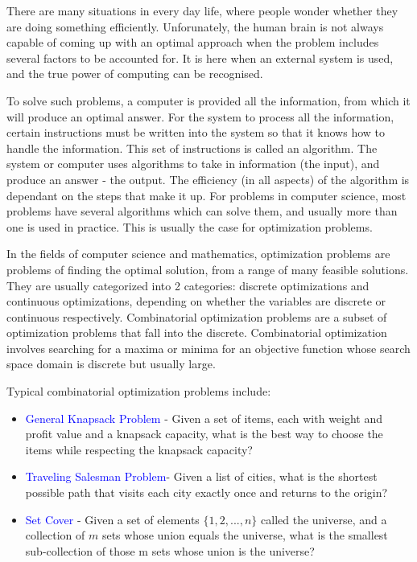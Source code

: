 \documentclass[titlepage]{article}
\begin{document}
\renewcommand{\familydefault}{Computer Modern}
There are many situations in every day life, where people wonder whether they are doing something efficiently. Unforunately, the human brain is not always capable of coming up with an optimal approach when the problem includes several factors to be accounted for. It is here when an external system is used, and the true power of computing can be recognised. 

To solve such problems, a computer is provided all the information, from which it will produce an optimal answer. For the system to process all the information, certain instructions must be written into the system so that it knows how to handle the information. This set of instructions is called an algorithm. The system or computer uses algorithms to take in information (the input), and produce an answer - the output. The efficiency (in all aspects) of the algorithm is dependant on the steps that make it up. For problems in computer science, most problems have several algorithms which can solve them, and usually more than one is used in practice. This is usually the case for optimization problems. 

In the fields of computer science and mathematics, optimization problems are problems of finding the optimal solution, from a range of many feasible solutions. They are usually categorized into 2 categories: discrete optimizations and continuous optimizations, depending on whether the variables are discrete or continuous respectively. Combinatorial optimization problems are a subset of optimization problems that fall into the discrete. Combinatorial optimization involves searching for a maxima or minima for an objective function whose search space domain is discrete but usually large.

Typical combinatorial optimization problems include:
\begin{itemize}
    \item \textcolor{blue}{General Knapsack Problem} - Given a set of items, each with weight and profit value and a knapsack capacity, what is the best way to choose the items while respecting the knapsack capacity?
    \item \textcolor{blue}{Traveling Salesman Problem}- Given a list of cities, what is the shortest possible path that visits each city exactly once and returns to the origin?
    \item \textcolor{blue}{Set Cover} - Given a set of elements $\{1, 2, ..., n\}$ called the universe, and a collection of $m$ sets whose union equals the universe, what is the smallest sub-collection of those m sets whose union is the universe?
\end{itemize}
\end{document}
